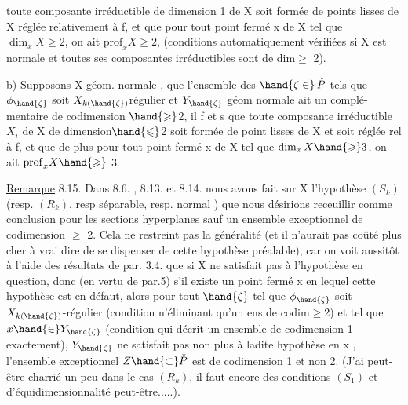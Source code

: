 
toute composante irréductible  de dimension 1  de X soit 
formée de points lisses de X  réglée relativement à f, et que
pour tout point fermé  x de X tel que $\dim_x X \geqslant 2$, on ait $\mathrm{prof}_x X \geqslant 2$,
(conditions automatiquement vérifiées si X est  normale et toutes ses
composantes irréductibles sont de dim$\geqslant$ 2).

b) Supposons X géom. normale ,  que l'ensemble  des $\hand{\zeta \in}\, \check{P}$
tels que $\phi_{\hand{\zeta}}$ soit $X_{k(\hand{\zeta})}$\hand{-}régulier et $Y_{\hand{\zeta}}$  géom normale ait un complé-%
mentaire de codimension $\hand{\geqslant}$2, il f et s que  toute composante
irréductible $X_i$ de X de dimension$\hand{\leqslant}$2\unsure{\hand{,}} soit formée de point lisses de
X et soit réglée rel à f, et que de plus pour tout point fermé x de X
tel que $\dim_x X \hand{\geqslant} 3$, on ait $\mathrm{prof}_x X \hand{\geqslant}$ 3.


\uline{Remarque} 8.15. Dans 8.6. , 8.13. et 8.14. nous avons fait sur X
l'hypothèse $(S_k)$ (resp. $(R_k)$, resp\unsure{:} séparable, resp.  normal ) que
nous désirions receuillir comme conclusion pour les sections hyperplanes
sauf  un ensemble exceptionnel de codimension $\geqslant$ 2. Cela ne restreint
pas la généralité (et il n'aurait pas coûté plus cher à vrai dire
de se dispenser de cette hypothèse préalable), car on voit aussitôt
à l'aide des résultats de par. 3.4.  que si X ne satisfait pas à
l'hypothèse en question, donc (en vertu de par.5) s'il existe un point
\uline{fermé} x en lequel cette hypothèse est en défaut, alors pour tout $\hand{\zeta}$ tel
que $\phi_{\hand{\zeta}}$ soit $X_{k(\hand{\zeta})}$-régulier (condition n'éliminant qu'un ens de codim$\geqslant$2)
et tel que $x \hand{\in} Y_{\hand{\zeta}}$ (condition qui décrit un ensemble de codimension 1
exactement), $Y_{\hand{\zeta}}$ ne satisfait pas non plus à ladite hypothèse en x ,
 l'ensemble exceptionnel $Z \hand{\subset} \check{P}$ est de codimension 1 et non 2.
(J'ai peut-être charrié un peu dans le cas $(R_k)$,  il faut encore
des conditions $(S_1)$ et d'équidimensionnalité peut-être.....).

